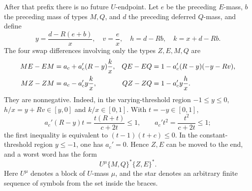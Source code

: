 After that prefix there is no future $U$-endpoint.  Let $e$ be the preceding
$E$-mass,
$b$ the preceding mass of types $M,Q$, and $d$ the preceding deferred
$Q$-mass, and define
\[
 y=\frac{d-R(e+b)}x,
 \quad v=\frac ex,
 \quad h=d-Rb,
 \quad k=x+d-Rb.
\]
The four swap differences involving only the types $Z,E,M,Q$ are
\begin{align}
 ME-EM&=a_c+a_c'(R-y)\frac{k}{x},
 &QE-EQ&=1-a_c'(R-y)(-y-Rv),
 \notag\\
 MZ-ZM&=a_c-a_c'y\frac{k}{x},
 &QZ-ZQ&=1-a_c'y\frac{h}{x}.
 \label{eq:opt:ordinary-commutators}
\end{align}
They are nonnegative.  Indeed, in the varying-threshold region
$-1\le y\le0$,
$h/x=y+Rv\in[y,0]$ and $k/x\in[0,1]$.  With $t=-y\in[0,1]$,
\begin{equation}
 a_c'(R-y)t=\frac{t(R+t)}{c+2t}\le1,
 \qquad
 a_c't^2=\frac{t^2}{c+2t}\le1;
 \label{eq:opt:ordinary-commutator-signs}
\end{equation}
the first inequality is equivalent to
$(t-1)(t+c)\le0$.  In the constant-threshold region $y\le-1$, one has
$a_c'=0$.  Hence $Z,E$ can be moved to the end, and a worst word has the form
\begin{equation}
 U^\mu\{M,Q\}^*\{Z,E\}^*.
 \label{eq:opt:canonical-word}
\end{equation}
Here $U^\mu$ denotes a block of $U$-mass $\mu$, and the star denotes an
arbitrary finite sequence of symbols from the set inside the braces.

